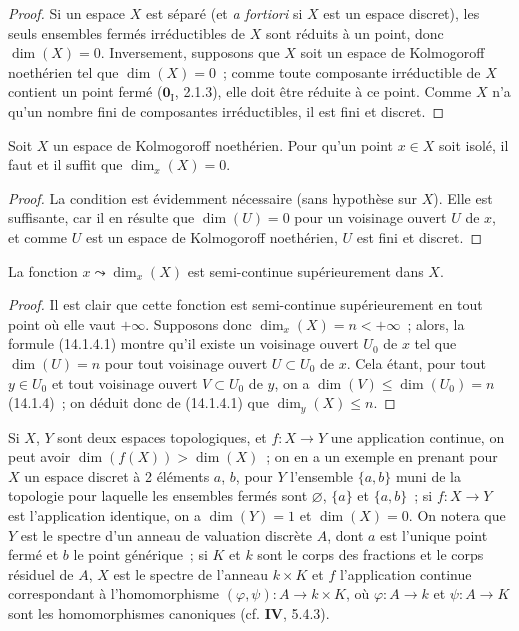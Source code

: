 \begin{proof}
Si un espace $X$ est séparé (et \emph{a fortiori} si $X$ est un espace
discret), les seuls ensembles fermés irréductibles de $X$ sont réduits à un
point, donc $\dim(X)=0$. Inversement, supposons que $X$ soit un espace de
Kolmogoroff noethérien tel que $\dim(X)=0$~; comme toute composante
irréductible de $X$ contient un point fermé ($\mathbf{0}_{\mathrm I}$, 2.1.3), elle
doit être réduite à ce point. Comme $X$ n'a qu'un nombre fini de composantes
irréductibles, il est fini et discret.
\end{proof}

\begin{corollary}[14.1.10]
\label{0.14.1.10-fr}
Soit $X$ un espace de Kolmogoroff noethérien. Pour qu'un point $x\in X$ soit
isolé, il faut et il suffit que $\dim_x(X)=0$.
\end{corollary}

\begin{proof}
La condition est évidemment nécessaire (sans hypothèse sur $X$). Elle est
suffisante,
car il en résulte que $\dim(U)=0$ pour un voisinage ouvert $U$ de $x$, et
comme $U$ est un espace de Kolmogoroff noethérien, $U$ est fini et discret.
\end{proof}

\begin{proposition}[14.1.11]
\label{0.14.1.11-fr}
La fonction $x\leadsto\dim_x(X)$ est semi-continue supérieurement dans $X$.
\end{proposition}

\begin{proof}
Il est clair que cette fonction est semi-continue supérieurement en tout
point où elle vaut $+\infty$. Supposons donc $\dim_x(X)=n<+\infty$~; alors,
la formule (14.1.4.1) montre qu'il existe un voisinage ouvert $U_0$ de $x$ tel
que $\dim(U)=n$ pour tout voisinage ouvert $U\subset U_0$ de $x$. Cela étant,
pour tout $y\in U_0$ et tout voisinage ouvert $V\subset U_0$ de $y$, on a
$\dim(V)\leq\dim(U_0)=n$ (14.1.4)~; on déduit donc de (14.1.4.1) que
$\dim_y(X)\leq n$.
\end{proof}

\begin{remark}[14.1.12]
\label{0.14.1.12-fr}
Si $X$, $Y$ sont deux espaces topologiques, et $f:X\to Y$ une application
continue, on peut avoir $\dim(f(X))>\dim(X)$~; on en a un exemple en prenant
pour $X$ un espace discret à 2 éléments $a$, $b$, pour $Y$ l'ensemble
$\{a,b\}$ muni de la topologie pour laquelle les ensembles fermés sont
$\varnothing$, $\{a\}$ et $\{a,b\}$~; si $f:X\to Y$ est l'application
identique, on a $\dim(Y)=1$ et $\dim(X)=0$. On notera que $Y$ est le spectre
d'un anneau de valuation discrète $A$, dont $a$ est l'unique point fermé et
$b$ le point générique~; si $K$ et $k$ sont le corps des fractions et le
corps résiduel de $A$, $X$ est le spectre de l'anneau $k\times K$ et $f$
l'application continue correspondant à l'homomorphisme
$(\varphi,\psi):A\to k\times K$, où $\varphi:A\to k$ et $\psi:A\to K$ sont
les homomorphismes canoniques (cf. \textbf{IV}, 5.4.3).
\end{remark}


